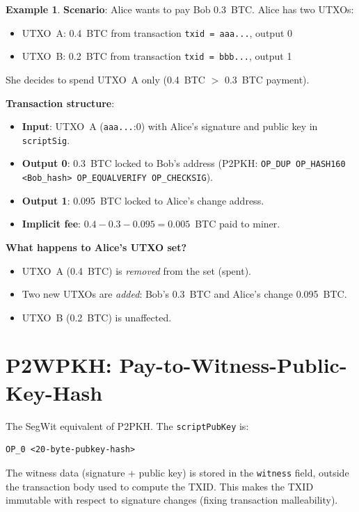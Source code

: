 \documentclass[12pt,a4paper,openany]{book}
\theoremstyle{definition}
\newtheorem{example}{Example}[chapter]
\theoremstyle{plain}
\theoremstyle{remark}
\begin{document}
\begin{example}
  \textbf{Scenario}: Alice wants to pay Bob 0.3~BTC.  Alice has two
  UTXOs:
  \begin{itemize}
    \item UTXO~A: 0.4~BTC from transaction \texttt{txid\,=\,aaa...}, output 0
    \item UTXO~B: 0.2~BTC from transaction \texttt{txid\,=\,bbb...}, output 1
  \end{itemize}
  She decides to spend UTXO~A only (0.4~BTC $>$ 0.3~BTC payment).

  \textbf{Transaction structure}:
  \begin{itemize}
    \item \textbf{Input}: UTXO~A (\texttt{aaa...}:0) with Alice's
          signature and public key in \texttt{scriptSig}.
    \item \textbf{Output 0}: 0.3~BTC locked to Bob's address
          (P2PKH: \texttt{OP\_DUP OP\_HASH160 <Bob\_hash> OP\_EQUALVERIFY OP\_CHECKSIG}).
    \item \textbf{Output 1}: 0.095~BTC locked to Alice's change address.
    \item \textbf{Implicit fee}: $0.4 - 0.3 - 0.095 = 0.005$~BTC paid to miner.
  \end{itemize}

  \textbf{What happens to Alice's UTXO set?}
  \begin{itemize}
    \item UTXO~A (0.4~BTC) is \emph{removed} from the set (spent).
    \item Two new UTXOs are \emph{added}: Bob's 0.3~BTC and Alice's change 0.095~BTC.
    \item UTXO~B (0.2~BTC) is unaffected.
  \end{itemize}
\end{example}

\section{P2WPKH: Pay-to-Witness-Public-Key-Hash}

The SegWit equivalent of P2PKH.  The \texttt{scriptPubKey} is:
\begin{lstlisting}[language={}]
OP_0 <20-byte-pubkey-hash>
\end{lstlisting}

The witness data (signature + public key) is stored in the
\texttt{witness} field, outside the transaction body used to compute the
TXID.  This makes the TXID immutable with respect to signature changes
(fixing transaction malleability).
\end{document}
